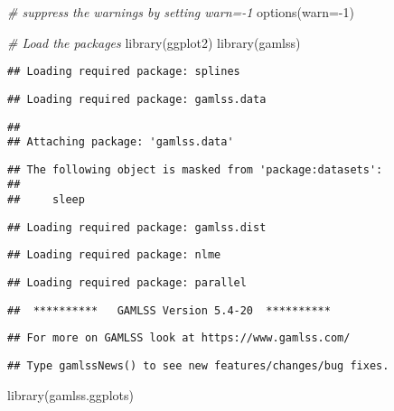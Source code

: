 \documentclass[
]{article}
\newenvironment{Shaded}{\begin{snugshade}}{\end{snugshade}}
\newcommand{\AttributeTok}[1]{\textcolor[rgb]{0.77,0.63,0.00}{#1}}
\newcommand{\CommentTok}[1]{\textcolor[rgb]{0.56,0.35,0.01}{\textit{#1}}}
\newcommand{\DecValTok}[1]{\textcolor[rgb]{0.00,0.00,0.81}{#1}}
\newcommand{\FunctionTok}[1]{\textcolor[rgb]{0.00,0.00,0.00}{#1}}
\newcommand{\NormalTok}[1]{#1}
\newcommand{\SpecialCharTok}[1]{\textcolor[rgb]{0.00,0.00,0.00}{#1}}
\begin{document}
\begin{Shaded}
\begin{Highlighting}[]
\CommentTok{\# suppress the warnings by setting warn={-}1 }
\FunctionTok{options}\NormalTok{(}\AttributeTok{warn=}\SpecialCharTok{{-}}\DecValTok{1}\NormalTok{)}

\CommentTok{\# Load the packages}
\FunctionTok{library}\NormalTok{(ggplot2)}
\FunctionTok{library}\NormalTok{(gamlss)}
\end{Highlighting}
\end{Shaded}

\begin{verbatim}
## Loading required package: splines
\end{verbatim}

\begin{verbatim}
## Loading required package: gamlss.data
\end{verbatim}

\begin{verbatim}
## 
## Attaching package: 'gamlss.data'
\end{verbatim}

\begin{verbatim}
## The following object is masked from 'package:datasets':
## 
##     sleep
\end{verbatim}

\begin{verbatim}
## Loading required package: gamlss.dist
\end{verbatim}

\begin{verbatim}
## Loading required package: nlme
\end{verbatim}

\begin{verbatim}
## Loading required package: parallel
\end{verbatim}

\begin{verbatim}
##  **********   GAMLSS Version 5.4-20  **********
\end{verbatim}

\begin{verbatim}
## For more on GAMLSS look at https://www.gamlss.com/
\end{verbatim}

\begin{verbatim}
## Type gamlssNews() to see new features/changes/bug fixes.
\end{verbatim}

\begin{Shaded}
\begin{Highlighting}[]
\FunctionTok{library}\NormalTok{(gamlss.ggplots)}
\end{Highlighting}
\end{Shaded}
\end{document}
